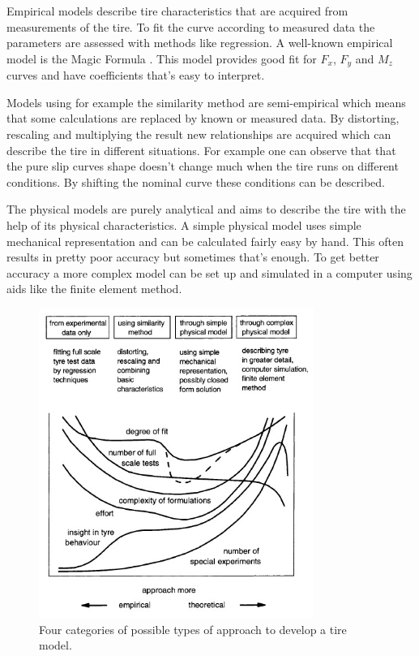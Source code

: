 Empirical models describe tire characteristics that are acquired from measurements of the tire. To fit the curve according to measured data the parameters are assessed with methods like regression. A well-known empirical model is the Magic Formula \cite{pacejka}. This model provides good fit for $F_{x}$, $F_{y}$ and $M_{z}$ curves and have coefficients that's easy to interpret.

Models using for example the similarity method are semi-empirical which means that some calculations are replaced by known or measured data. By distorting, rescaling and multiplying the result new relationships are acquired which can describe the tire in different situations. For example one can observe that that the pure slip curves shape doesn't change much \cite{pacejka} when the tire runs on different conditions. By shifting the nominal curve these conditions can be described.

The physical models are purely analytical and aims to describe the tire with the help of its physical characteristics. A simple physical model uses simple mechanical representation and can be calculated fairly easy by hand. This often results in pretty poor accuracy but sometimes that's enough. To get better accuracy a more complex model can be set up and simulated in a computer using aids like the finite element method. 

\begin{figure}[h]
	\centering
	\includegraphics[width=0.8\textwidth]{Pictures/tire_modeling}
	\caption{Four categories of possible types of approach to develop a tire model. \cite{pacejka}}
	\label{tire_modeling}
\end{figure}

